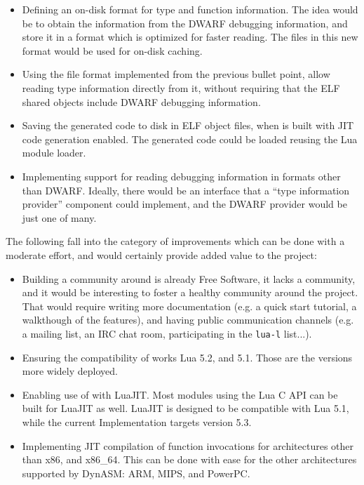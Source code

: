 \begin{itemize}

	\item Defining an on-disk format for type and function information. The
	idea would be to obtain the information from the DWARF debugging
	information, and store it in a format which is optimized for faster
	reading. The files in this new format would be used for on-disk caching.

	\item Using the file format implemented from the previous bullet point,
	allow reading type information directly from it, without requiring that
	the ELF shared objects include DWARF debugging information.

	\item Saving the generated code to disk in ELF object files, when \Eol* is
	built with JIT code generation enabled.	The generated code could be loaded
	reusing the Lua module loader.

	\item Implementing support for reading debugging information in formats
	other than DWARF. Ideally, there would be an interface that a “type
	information provider” component could implement, and the DWARF provider
	would be just one of many.

\end{itemize}

The following fall into the category of improvements which can be done with
a moderate effort, and would certainly provide added value to the project:


\begin{itemize}

	\item Building a community around \Eol* is already Free Software, it lacks
	a community, and it would be interesting to foster a healthy community
	around the project. That would require writing more documentation (e.g.
	a quick start tutorial, a walkthough of the features), and having public
	communication channels (e.g. a mailing list, an \gls{IRC} chat room,
	participating in the \verb|lua-l| list...).

	\item Ensuring the compatibility of \Eol* works Lua 5.2, and 5.1. Those
	are the versions more widely deployed.

	\item Enabling use of \Eol* with LuaJIT. Most modules using the Lua C API
	can be built for LuaJIT as well. LuaJIT is designed to be compatible with
	Lua	5.1, while the current Implementation targets version 5.3.

	\item Implementing JIT compilation of function invocations for
	architectures other than x86, and x86\_64. This can be done with ease for
	the other architectures supported by DynASM: ARM, MIPS, and PowerPC.

\end{itemize}

\beforeintro
